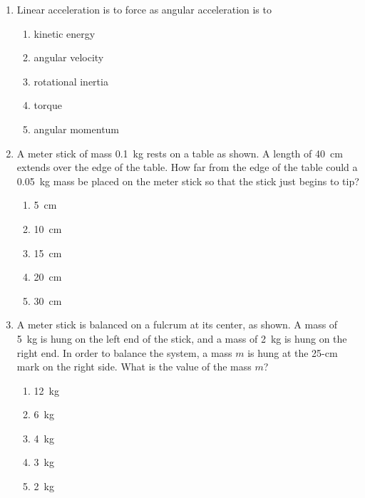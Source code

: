 \documentclass{../../../oss-apphys}
\begin{document}
\genheader


\genmultidirections

\gengravity

\raggedcolumns
\begin{multicols}{2}
  \begin{enumerate}[leftmargin=18pt]
  \item Linear acceleration is to force as angular acceleration is to
    \begin{enumerate}[noitemsep,topsep=0pt,leftmargin=18pt,label=(\Alph*)]
    \item kinetic energy
    \item angular velocity
    \item rotational inertia
    \item torque
    \item angular momentum
    \end{enumerate}

  \item A meter stick of mass \SI{.1}{\kilo\gram} rests on a table as shown. A
    length of \SI{40}{\centi\metre} extends over the edge of the table. How far
    from the edge of the table could a \SI{.05}{\kilo\gram} mass be placed on
    the meter stick so that the stick just begins to tip?
    \begin{center}
      \vspace{-.2in}
    \end{center}
    \begin{enumerate}[noitemsep,topsep=0pt,leftmargin=18pt,label=(\Alph*)]
    \item\SI{5}{\centi\metre}
    \item\SI{10}{\centi\metre}
    \item\SI{15}{\centi\metre}
    \item\SI{20}{\centi\metre}
    \item\SI{30}{\centi\metre}
    \end{enumerate}
    
  \item A meter stick is balanced on a fulcrum at its center, as shown. A mass
    of \SI{5}{\kilo\gram} is hung on the left end of the stick, and a mass of
    \SI{2}{\kilo\gram} is hung on the right end. In order to balance the
    system, a mass $m$ is hung at the 25-cm mark on the right
    side. What is the value of the mass $m$?
    \begin{center}
    \end{center}
    \begin{enumerate}[noitemsep,topsep=0pt,leftmargin=18pt,label=(\Alph*)]
    \item\SI{12}{\kilo\gram}
    \item\SI{6 }{\kilo\gram}
    \item\SI{4 }{\kilo\gram}
    \item\SI{3 }{\kilo\gram}
    \item\SI{2 }{\kilo\gram}
    \end{enumerate}
    

\end{enumerate}
\end{multicols}
\end{document}
